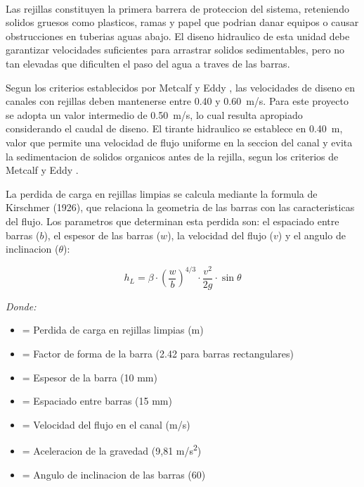 \

Las rejillas constituyen la primera barrera de proteccion del sistema, reteniendo solidos gruesos como plasticos, ramas y papel que podrian danar equipos o causar obstrucciones en tuberias aguas abajo. El diseno hidraulico de esta unidad debe garantizar velocidades suficientes para arrastrar solidos sedimentables, pero no tan elevadas que dificulten el paso del agua a traves de las barras.

Segun los criterios establecidos por Metcalf y Eddy \cite{metcalf2014}, las velocidades de diseno en canales con rejillas deben mantenerse entre 0.40 y 0.60~m/s. Para este proyecto se adopta un valor intermedio de 0.50~m/s, lo cual resulta apropiado considerando el caudal de diseno. El tirante hidraulico se establece en 0.40~m, valor que permite una velocidad de flujo uniforme en la seccion del canal y evita la sedimentacion de solidos organicos antes de la rejilla, segun los criterios de Metcalf y Eddy \cite{metcalf2014}.

La perdida de carga en rejillas limpias se calcula mediante la formula de Kirschmer (1926), que relaciona la geometria de las barras con las caracteristicas del flujo. Los parametros que determinan esta perdida son: el espaciado entre barras ($b$), el espesor de las barras ($w$), la velocidad del flujo ($v$) y el angulo de inclinacion ($\theta$):

\begin{equation}
h_L = \beta \cdot \left(\frac{w}{b}\right)^{4/3} \cdot \frac{v^2}{2g} \cdot \sin\theta
\end{equation}

\textit{Donde:}
\begin{itemize}[noitemsep,leftmargin=2em]
    \item[$h_L$] = Perdida de carga en rejillas limpias (m)
    \item[$\beta$] = Factor de forma de la barra (2.42 para barras rectangulares)
    \item[$w$] = Espesor de la barra (10 mm)
    \item[$b$] = Espaciado entre barras (15 mm)
    \item[$v$] = Velocidad del flujo en el canal (m/s)
    \item[$g$] = Aceleracion de la gravedad (9,81 m/s\textsuperscript{2})
    \item[$\theta$] = Angulo de inclinacion de las barras (60\textdegree)
\end{itemize}

